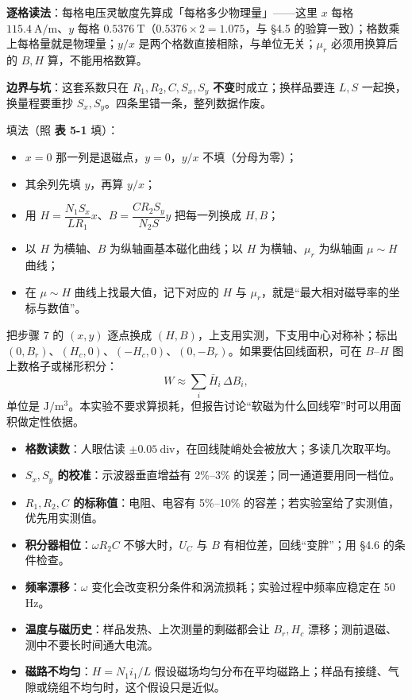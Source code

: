 \documentclass[11pt]{ctexart}
\begin{document}
\textbf{逐格读法}：每格电压灵敏度先算成「每格多少物理量」——这里 \(x\) 每格 \(115.4\ \mathrm{A/m}\)、\(y\) 每格 \(0.5376\ \mathrm{T}\)（\(0.5376\times2=1.075\)，与 §4.5 的验算一致）；格数乘上每格量就是物理量；\(y/x\) 是两个格数直接相除，与单位无关；\(\mu_r\) 必须用换算后的 \(B,H\) 算，不能用格数算。

\textbf{边界与坑}：这套系数只在 \(R_1,R_2,C,S_x,S_y\) \textbf{不变}时成立；换样品要连 \(L,S\) 一起换，换量程要重抄 \(S_x,S_y\)。四条里错一条，整列数据作废。

填法（照 \textbf{表 5-1} 填）：

\begin{itemize}
\item \(x=0\) 那一列是退磁点，\(y=0\)，\(y/x\) 不填（分母为零）；
\item 其余列先填 \(y\)，再算 \(y/x\)；
\item 用 \(H=\dfrac{N_1S_x}{LR_1}x\)、\(B=\dfrac{CR_2S_y}{N_2S}y\) 把每一列换成 \(H,B\)；
\item 以 \(H\) 为横轴、\(B\) 为纵轴画基本磁化曲线；以 \(H\) 为横轴、\(\mu_r\) 为纵轴画 \(\mu\sim H\) 曲线；
\item 在 \(\mu\sim H\) 曲线上找最大值，记下对应的 \(H\) 与 \(\mu_r\)，就是“最大相对磁导率的坐标与数值”。
\end{itemize}


把步骤 7 的 \((x,y)\) 逐点换成 \((H,B)\)，上支用实测，下支用中心对称补；标出 \((0,B_r)\)、\((H_c,0)\)、\((-H_c,0)\)、\((0,-B_r)\)。如果要估回线面积，可在 \(B\)--\(H\) 图上数格子或梯形积分：
\[
W\approx\sum_i \bar H_i\,\Delta B_i,
\]
单位是 \(\mathrm{J/m^3}\)。本实验不要求算损耗，但报告讨论“软磁为什么回线窄”时可以用面积做定性依据。


\begin{itemize}
\item \textbf{格数读数}：人眼估读 \(\pm0.05\ \mathrm{div}\)，在回线陡峭处会被放大；多读几次取平均。
\item \textbf{\(S_x,S_y\) 的校准}：示波器垂直增益有 2\%--3\% 的误差；同一通道要用同一档位。
\item \textbf{\(R_1,R_2,C\) 的标称值}：电阻、电容有 5\%--10\% 的容差；若实验室给了实测值，优先用实测值。
\item \textbf{积分器相位}：\(\omega R_2C\) 不够大时，\(U_C\) 与 \(B\) 有相位差，回线“变胖”；用 §4.6 的条件检查。
\item \textbf{频率漂移}：\(\omega\) 变化会改变积分条件和涡流损耗；实验过程中频率应稳定在 50 Hz。
\item \textbf{温度与磁历史}：样品发热、上次测量的剩磁都会让 \(B_r,H_c\) 漂移；测前退磁、测中不要长时间通大电流。
\item \textbf{磁路不均匀}：\(H=N_1i_1/L\) 假设磁场均匀分布在平均磁路上；样品有接缝、气隙或绕组不均匀时，这个假设只是近似。
\end{itemize}
\end{document}
